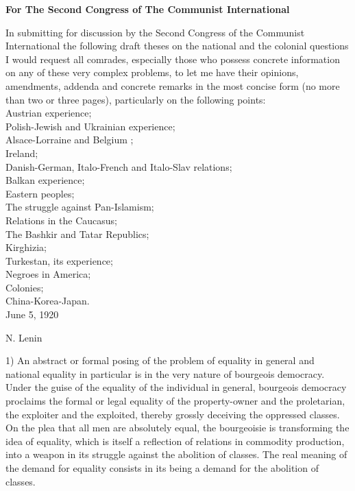 


\textbf{For The Second Congress of The Communist International}

In submitting for discussion by the Second Congress of the Communist International the following draft theses on the national and the colonial questions I would request all comrades, especially those who possess concrete information on any of these very complex problems, to let me have their opinions, amendments, addenda and concrete remarks in the most concise form (no more than two or three pages), particularly on the following points:\\
\indent Austrian experience; \\
\indent Polish-Jewish and Ukrainian experience; \\
\indent Alsace-Lorraine and Belgium ; \\
\indent Ireland; \\
\indent Danish-German, Italo-French and Italo-Slav relations; \\
\indent Balkan experience; \\
\indent Eastern peoples; \\
\indent The struggle against Pan-Islamism; \\
\indent Relations in the Caucasus; \\
\indent The Bashkir and Tatar Republics; \\
\indent Kirghizia; \\
\indent Turkestan, its experience; \\
\indent Negroes in America; \\
\indent Colonies; \\
\indent China-Korea-Japan. \\

June 5, 1920 
\begin{flushright}
N. Lenin 
\end{flushright}


1) An abstract or formal posing of the problem of equality in general and national equality in particular is in the very nature of bourgeois democracy. Under the guise of the equality of the individual in general, bourgeois democracy proclaims the formal or legal equality of the property-owner and the proletarian, the exploiter and the exploited, thereby grossly deceiving the oppressed classes. On the plea that all men are absolutely equal, the bourgeoisie is transforming the idea of equality, which is itself a reflection of relations in commodity production, into a weapon in its struggle against the abolition of classes. The real meaning of the demand for equality consists in its being a demand for the abolition of classes. 

